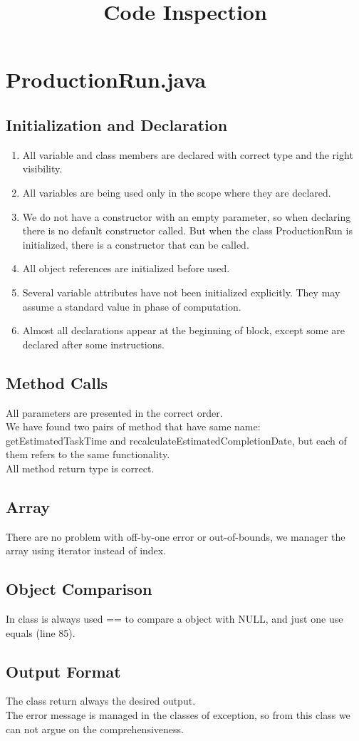 \documentclass{article}
\title{Code Inspection}
\begin{document}
\section{ProductionRun.java}

\subsection{Initialization and Declaration}
\begin{enumerate}
\item
All variable and class members are declared with correct type and the right visibility.
\item
All variables are being used only in the scope where they are declared.
\item
We do not have a constructor with  an empty parameter, so when declaring there is no  default constructor called. But when the class ProductionRun is initialized, there is a constructor that can be called.
\item
All object references are initialized before used.
\item
Several variable attributes have not been initialized explicitly. They may assume a standard value in phase of computation. 
\item
Almost all declarations appear at the beginning of block, except some are declared after some instructions.
\end{enumerate}
\subsection{Method Calls}
All parameters are presented in the correct order.\\
We have found two pairs of method that have same name: getEstimatedTaskTime and recalculateEstimatedCompletionDate, but each of them  refers to the same functionality.\\
All method return type is correct.
\subsection{Array}
There are no problem with off-by-one error or out-of-bounds, we manager the array using iterator instead of index.
\subsection{Object Comparison}
In class is always used == to compare a object with NULL, and just one use equals (line 85).
\subsection{Output Format}
The class return always the desired output.\\
The error message is managed in the classes of exception, so from this class we can not argue on the comprehensiveness.
\end{document}
